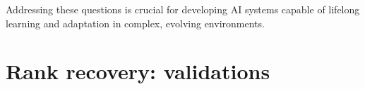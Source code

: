 \documentclass{article}
\begin{document}
Addressing these questions is crucial for developing AI systems capable of lifelong learning and adaptation in complex, evolving environments.







\appendix

\section{Rank recovery: validations }
\label{app:additional_empirical_evidence}
\end{document}
